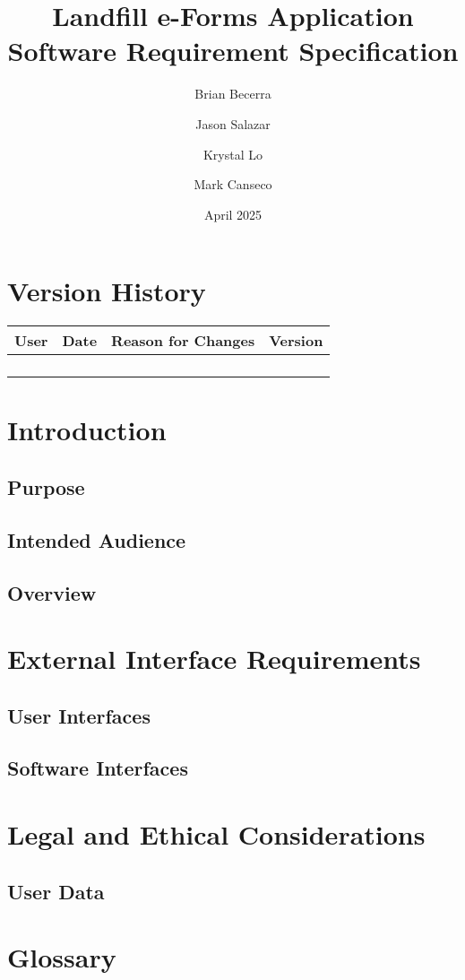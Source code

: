 \documentclass[12pt]{article}
\title{Landfill e-Forms Application\\
Software Requirement Specification}
\author{
    Brian Becerra\\
    \and
    Jason Salazar\\
    \and
    Krystal Lo\\
    \and
    Mark Canseco\\
    }
\date{April 2025}
\begin{document}
\begin{titlepage}
\maketitle
\thispagestyle{empty}
\end{titlepage}

\thispagestyle{empty}
\tableofcontents
\newpage

\section*{Version History}
\begin{table}[ht]
    \centering
    \begin{tabular}{|c|c|c|c|}
    \hline
    \textbf{User} & \textbf{Date} & \textbf{Reason for Changes} & \textbf{Version}\\
    \hline
         &  &  & \\
    \hline
         &  &  & \\
    \hline
         &  &  & \\
    \hline
         &  &  & \\
    \hline
    \end{tabular}
\end{table}
\newpage

\section{Introduction}
\subsection{Purpose}
\subsection{Intended Audience}
\subsection{Overview}
\newpage

\section{External Interface Requirements}
\subsection{User Interfaces}
\subsection{Software Interfaces}
\newpage

\section{Legal and Ethical Considerations}
\subsection{User Data}
\newpage

\section*{Glossary}
\begin{description}
    \item[]
\end{description}
\end{document}
